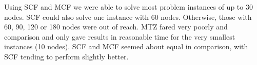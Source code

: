 Using SCF and MCF we were able to solve most problem instances of up to 30 nodes. SCF could also solve one instance with 60 nodes. Otherwise, those with 60, 90, 120 or 180 nodes were out of reach.
MTZ fared very poorly and comparison and only gave results in reasonable time for the very smallest instances (10 nodes). SCF and MCF seemed about equal in comparison, with SCF tending to perform slightly better.

